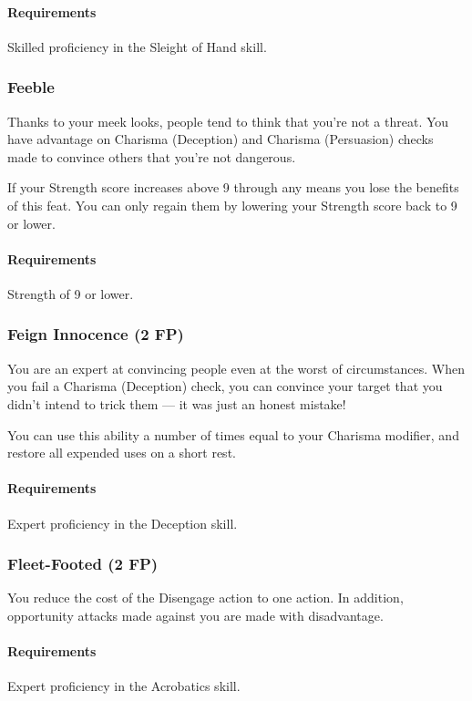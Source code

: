     \paragraph{Requirements} Skilled proficiency in the Sleight of Hand skill.
\subsubsection{Feeble} \label{feat::feeble}
    Thanks to your meek looks, people tend to think that you're not a threat.
    You have advantage on Charisma (Deception) and Charisma (Persuasion) checks made to convince others that you're not dangerous.

    If your Strength score increases above 9 through any means you lose the benefits of this feat.
    You can only regain them by lowering your Strength score back to 9 or lower.
    \paragraph{Requirements} Strength of 9 or lower.
\subsubsection{Feign Innocence (2 FP)} \label{feat::feigninnocence}
    You are an expert at convincing people even at the worst of circumstances.
    When you fail a Charisma (Deception) check, you can convince your target that you didn't intend to trick them --- it was just an honest mistake!

    You can use this ability a number of times equal to your Charisma modifier, and restore all expended uses on a short rest.
    \paragraph{Requirements} Expert proficiency in the Deception skill.
\subsubsection{Fleet-Footed (2 FP)} \label{feat::fleetfooted}
    You reduce the cost of the Disengage action to one action.
    In addition, opportunity attacks made against you are made with disadvantage.
    \paragraph{Requirements} Expert proficiency in the Acrobatics skill.
